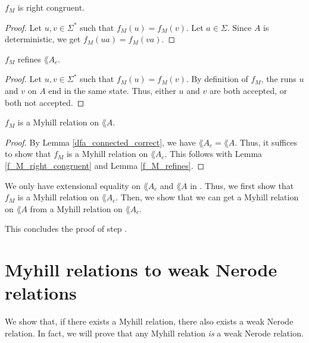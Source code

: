 \begin{lemma}
    \label{f_M_right_congruent}
    $f_M$ is right congruent.
\end{lemma}
\begin{proof}
    Let $u,v \in \Sigma^*$ such that ${f_M}(u) = {f_M}(v)$.
    Let $a \in \Sigma$. Since $A$ is deterministic, we get ${f_M}(ua) = {f_M}(va)$.
\end{proof}

\begin{lemma}
    \label{f_M_refines}
    $f_M$ refines $\lang{A_c}$.
\end{lemma}
\begin{proof}
    Let $u,v \in \Sigma^*$ such that ${f_M}(u) = {f_M}(v)$.
    By definition of $f_M$, the runs $u$ and $v$ on $A$ end in the same state.
    Thus, either $u$ and $v$ are both accepted, or both not accepted.
\end{proof}

\begin{theorem}
    \label{dfa_to_myhill}
    $f_M$ is a Myhill relation on $\lang{A}$.
\end{theorem}
\begin{proof}
    By Lemma \ref{dfa_connected_correct}, we have $\lang{A_c} = \lang{A}$.
    Thus, it suffices to show that $f_M$ is a Myhill relation on $\lang{A_c}$.
    This follows with Lemma \ref{f_M_right_congruent} and Lemma \ref{f_M_refines}.
\end{proof}


We only have extensional equality on $\lang{A_c}$ and $\lang{A}$ in \coq.
Thus, we first show that $f_M$ is a Myhill relation on $\lang{A_c}$.
Then, we show that we can get a Myhill relation on $\lang{A}$ from a Myhill relation on $\lang{A_c}$.



This concludes the proof of step .

\section{Myhill relations to weak Nerode relations}
We show that, if there exists a Myhill relation, there also exists a weak Nerode relation.
In fact, we will prove that any Myhill relation \textit{is} a weak Nerode relation.

